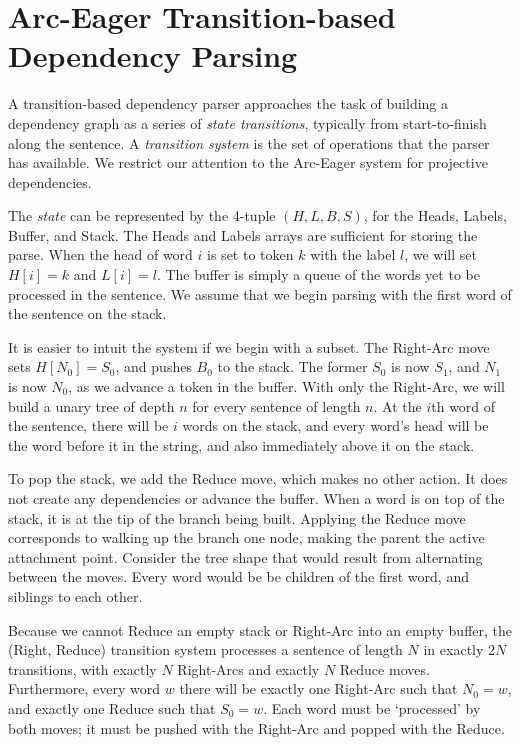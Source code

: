 \documentclass[11pt,letterpaper]{article}
\begin{document}
\section{Arc-Eager Transition-based Dependency Parsing}

A transition-based dependency parser approaches the task of building a dependency
graph as a series of \emph{state transitions}, typically from start-to-finish
along the sentence. A \emph{transition system} is the set of operations that the
parser has available. We restrict our attention to the Arc-Eager system \citep{nivre:04}
for projective dependencies.

The \emph{state} can be represented by the
4-tuple $(H, L, B, S)$, for the Heads, Labels, Buffer, and Stack. The Heads
and Labels arrays are sufficient for storing the parse. When the head of word $i$
is set to token $k$ with the label $l$, we will set $H[i]=k$ and $L[i]=l$.
The buffer is simply a queue of the words yet to be processed in the sentence.
We assume that we begin parsing with the first word of the sentence on the stack.

It is easier to intuit the system if we begin with a subset. The Right-Arc move
sets $H[N_0]=S_0$, and pushes $B_0$ to the stack. The former $S_0$ is now $S_1$,
and $N_1$ is now $N_0$, as we advance a token in the buffer. 
With only the Right-Arc, we will build a unary tree of depth $n$ for every
sentence of length $n$.
At the $i$th word of the sentence, there will be $i$ words on the stack, and
every word's head will be the word before it in the string, and also immediately
above it on the stack.

To pop the stack, we add the Reduce move, which makes no other action.
It does not create any dependencies or advance the buffer.
When a word is on top of the stack, it is at the tip of the branch being built.
Applying the Reduce move corresponds to walking up the branch one node, making the
parent the active attachment point. Consider the tree shape that would result
from alternating between the moves.
Every word would be be children of the first word, and siblings to each other.

Because we cannot Reduce an empty stack or Right-Arc into an empty buffer,
the (Right, Reduce) transition system processes a sentence of length $N$ in exactly $2N$
transitions, with exactly $N$ Right-Arcs and exactly $N$ Reduce moves. Furthermore,
every word $w$ there will be exactly one Right-Arc such that $N_0=w$, and exactly
one Reduce such that $S_0=w$. Each word must be `processed' by both moves; it must be
pushed with the Right-Arc and popped with the Reduce.
\end{document}
